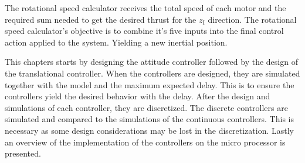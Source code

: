 The rotational speed calculator receives the total speed of each motor and the required sum needed to get the desired thrust for the $z\mathrm{_I}$ direction. The rotational speed calculator's objective is to combine it's five inputs into the final control action applied to the system. Yielding a new inertial position.


This chapters starts by designing the attitude controller followed by the design of the translational controller. When the controllers are designed, they are simulated together with the model and the maximum expected delay. This is to ensure the controllers yield the desired behavior with the delay. After the design and simulations of each controller, they are discretized. The discrete controllers are simulated and compared to the simulations of the continuous controllers. This is necessary as some design considerations may be lost in the discretization. Lastly an overview of the implementation of the controllers on the micro processor is presented. 